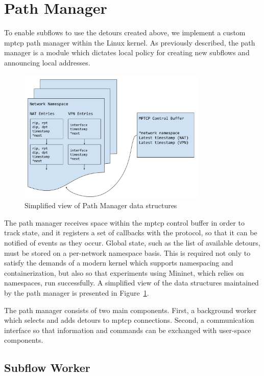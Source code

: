 \documentclass{cwru}
\begin{document}
\section{Path Manager}

To enable subflows to use the detours created above, we implement a custom
\ac{mptcp} path manager within the Linux kernel. As previously described, the
path manager is a module which dictates local policy for creating new subflows
and announcing local addresses.

\begin{figure}
  \centering
  \includegraphics[width=0.8\textwidth]{figures/KernDataStruct.pdf}
  \caption{Simplified view of Path Manager data structures}
  \label{fig:KernDataStruct}
\end{figure}

The path manager receives space within the \ac{mptcp} control buffer in order to
track state, and it registers a set of callbacks with the protocol, so that it
can be notified of events as they occur. Global state, such as the list of
available detours, must be stored on a per-network namespace basis. This is
required not only to satisfy the demands of a modern kernel which supports
namespacing and containerization, but also so that experiments using Mininet,
which relies on namespaces, run successfully. A simplified view of the data
structures maintained by the path manager is presented in
Figure~\ref{fig:KernDataStruct}.

The path manager consists of two main components. First, a background worker
which selects and adds detours to \ac{mptcp} connections. Second, a
communication interface so that information and commands can be exchanged with
user-space components.

\subsection{Subflow Worker}
\end{document}
